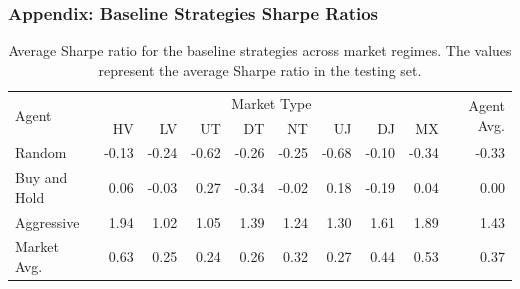 \documentclass{beamer}
\begin{document}
\begin{frame}
  \frametitle{Appendix: Baseline Strategies Sharpe Ratios}

  \begin{table}[htbp]
    \fontsize{7}{9}\selectfont
    \centering
    \caption[Baseline Strategies Sharpe Ratio]{Average Sharpe ratio for the baseline strategies across market regimes. The values represent the average Sharpe ratio in the testing set.}
    \begin{tabular}{l|rrrrrrrr|r}
    \hline
    \multirow{2}{*}{Agent} & \multicolumn{8}{c|}{Market Type} & \multirow{2}{*}{Agent Avg.} \\
    \cline{2-9}
    & HV &  LV &  UT &  DT &  NT &  UJ &  DJ & MX \\
    \hline
    Random       &     -0.13 &    -0.24 &     -0.62 &       -0.26 &     -0.25 &    -0.68 &      -0.10 &  -0.34 &       -0.33 \\
    Buy and Hold &      0.06 &    -0.03 &      0.27 &       -0.34 &     -0.02 &     0.18 &      -0.19 &   0.04 &       0.00 \\
    Aggressive   &      1.94 &     1.02 &      1.05 &        1.39 &      1.24 &     1.30 &       1.61 &   1.89 &        1.43 \\
    \hline
    Market Avg.  &      0.63 &     0.25 &      0.24 &        0.26 &      0.32 &     0.27 &       0.44 &   0.53 &        0.37 \\
    \end{tabular}
    \label{tab:baseline_sharpe_ratio}
  \end{table}
\end{frame}
\end{document}
